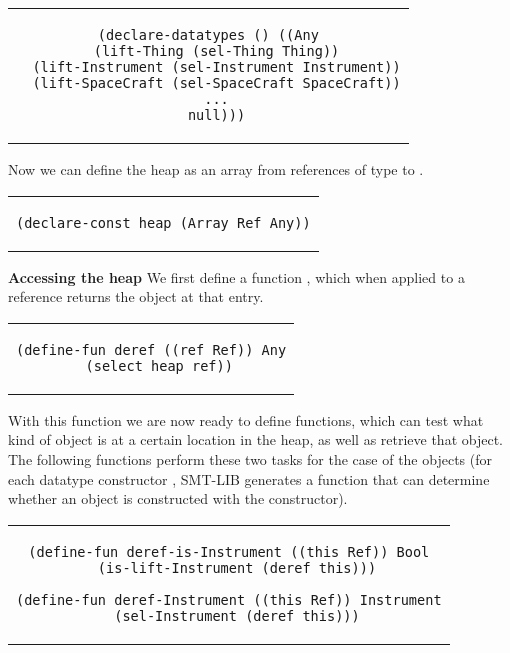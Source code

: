 \begin{center}
\begin{tabular}{c}
\begin{lstlisting}
(declare-datatypes () ((Any
  (lift-Thing (sel-Thing Thing))
  (lift-Instrument (sel-Instrument Instrument))
  (lift-SpaceCraft (sel-SpaceCraft SpaceCraft))
  ...
  null)))
\end{lstlisting}
\end{tabular}
\end{center}

\noindent Now we can define the heap as an array from references of
type  to .

\begin{center}
\begin{tabular}{c}
\begin{lstlisting}
(declare-const heap (Array Ref Any))
\end{lstlisting}
\end{tabular}
\end{center}

\textbf{Accessing the heap} We first define a function ,
which when applied to a reference returns the  object at
that entry.

\begin{center}
\begin{tabular}{c}
\begin{lstlisting}
(define-fun deref ((ref Ref)) Any
  (select heap ref))
\end{lstlisting}
\end{tabular}
\end{center}

\noindent With this function we are now ready to define functions,
which can test what kind of object is at a certain location in the
heap, as well as retrieve that object. The following functions perform
these two tasks for the case of the  objects (for
each datatype constructor , SMT-LIB generates a 
function that can determine whether an object is constructed with the
constructor).

\begin{center}
\begin{tabular}{c}
\begin{lstlisting}
(define-fun deref-is-Instrument ((this Ref)) Bool
  (is-lift-Instrument (deref this)))

(define-fun deref-Instrument ((this Ref)) Instrument
  (sel-Instrument (deref this)))
\end{lstlisting}
\end{tabular}
\end{center}

